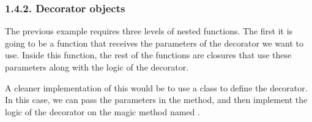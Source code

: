 \documentclass[a4paper,10pt,english]{sphinxmanual}
\begin{document}
\begin{sphinxVerbatim}[commandchars=\\\{\}]
 
     

 
     

 
     

      
 
     
\end{sphinxVerbatim}


\subsubsection{1.4.2. Decorator objects}
\label{\detokenize{chapters/5_decorators/index:decorator-objects}}
The previous example requires three levels of nested functions. The first it is going to be a
function that receives the parameters of the decorator we want to use. Inside this function,
the rest of the functions are closures that use these parameters along with the logic of the
decorator.

A cleaner implementation of this would be to use a class to define the decorator. In this
case, we can pass the parameters in the  method, and then implement the logic of
the decorator on the magic method named .
\end{document}
